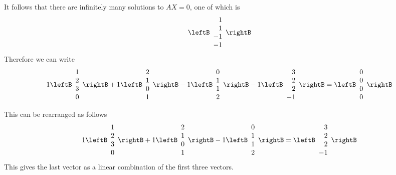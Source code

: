 \begin{solution}
It follows that there are infinitely many solutions to $AX=0$, one of which is
\begin{equation*}
\leftB 
\begin{array}{r}
1 \\ 
1 \\ 
-1 \\ 
-1
\end{array}
\rightB
\end{equation*}
Therefore we can write 
\begin{equation*}
1\leftB 
\begin{array}{r}
1 \\ 
2 \\ 
3 \\ 
0
\end{array}
\rightB +1\leftB
\begin{array}{r}
2 \\ 
1 \\ 
0 \\ 
1
\end{array}
\rightB  -1 \leftB 
\begin{array}{r}
0 \\ 
1 \\ 
1 \\ 
2
\end{array}
\rightB -1 \leftB 
\begin{array}{r}
3 \\ 
2 \\ 
2 \\ 
-1
\end{array}
\rightB =
\leftB 
\begin{array}{r}
0 \\ 
0 \\ 
0 \\ 
0
\end{array}
\rightB
\end{equation*}

This can be rearranged as follows
\begin{equation*}
1\leftB 
\begin{array}{r}
1 \\ 
2 \\ 
3 \\ 
0
\end{array}
\rightB +1\leftB
\begin{array}{r}
2 \\ 
1 \\ 
0 \\ 
1
\end{array}
\rightB  -1 \leftB 
\begin{array}{r}
0 \\ 
1 \\ 
1 \\ 
2
\end{array}
\rightB =\leftB 
\begin{array}{r}
3 \\ 
2 \\ 
2 \\ 
-1
\end{array}
\rightB 
\end{equation*}
This gives the last vector as a linear combination of the first three vectors.


\end{solution}

